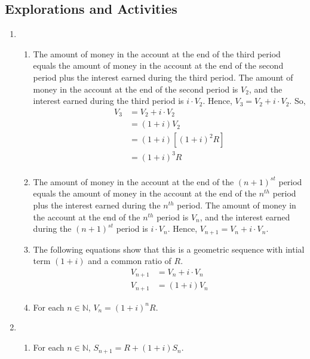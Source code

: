 \subsection*{Explorations and Activities}
\setcounter{oldenumi}{\theenumi}
\begin{enumerate} \setcounter{enumi}{\theoldenumi}
\item \begin{enumerate}
\item The amount of money in the account at the end of the third period equals the amount of money in the account at the end of the second period plus the interest earned during the third period.  The amount of money in the account at the end of the second period is  $V_2 $, and the interest earned during the third period is  $i \cdot V_2 $.  Hence,  $V_3  = V_2  + i \cdot V_2 $.  So, 
\[
\begin{aligned}
V_3  &= V_2  + i \cdot V_2  \\ 
     &= \left( {1 + i} \right)V_2  \\ 
     &= \left( {1 + i} \right)\left[ {\left( {1 + i} \right)^2 R} \right] \\ 
     &= \left( {1 + i} \right)^3 R \\ 
\end{aligned}
\]
\item The amount of money in the account at the end of the $\left( {n + 1} \right)^{st} $
 period equals the amount of money in the account at the end of the $n^{th} $ period plus the interest earned during the $n^{th} $ period.  The amount of money in the account at the end of the $n^{th} $ period is  $V_n $, and the interest earned during the $\left( {n + 1} \right)^{st}$ period is  $i \cdot V_n $.  Hence,  $V_{n + 1}  = V_n  + i \cdot V_n $.

\item  The following equations show that this is a geometric sequence with intial term  $\left( {1 + i} \right)$ and a common ratio of  $R$.
\begin{align*}
V_{n + 1}  &= V_n  + i \cdot V_n \\
V_{n + 1}  &= \left( {1 + i} \right)V_n
\end{align*}

\item For each  $n \in \mathbb{N}$,  $V_n  = \left( {1 + i} \right)^n R$.
\end{enumerate}


\item \begin{enumerate}
\item For each $n \in \mathbb{N}$, $S_{n+1} = R + \left( {1+i} \right) S_n$.


\end{enumerate}
\end{enumerate}
